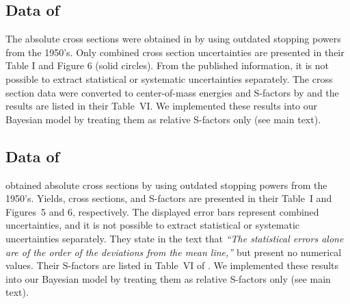 \documentclass[twocolumn]{aastex63}
\begin{document}
\subsection{Data of \citet{Gri62}}
\label{sec:ref_gri62}
The absolute cross sections were obtained in \citet{Gri62} by using outdated stopping powers from the 1950's. Only combined cross section uncertainties are presented in their Table I and Figure 6 (solid circles). From the published information, it is not possible to extract statistical or systematic uncertainties separately. The cross section data were converted to center-of-mass energies and S-factors by \citet{Coc15} and the results are listed in their Table~VI. We implemented these results into our Bayesian model by treating them as relative S-factors only (see main text). 

\subsection{Data of \citet{Gri63}}
\label{sec:ref_gri63}
\citet{Gri63} obtained absolute cross sections by using outdated stopping powers from the 1950's. Yields, cross sections, and S-factors are presented in their Table~I and Figures~5 and 6, respectively. The displayed error bars represent combined uncertainties, and it is not possible to extract statistical or systematic uncertainties separately. They state in the text that {\it ``The statistical errors alone are of the order of the deviations from the mean line,''} but present no numerical values. Their S-factors are listed in Table~VI of \citet{Coc15}. We implemented these results into our Bayesian model by treating them as relative S-factors only (see main text).

\end{document}
